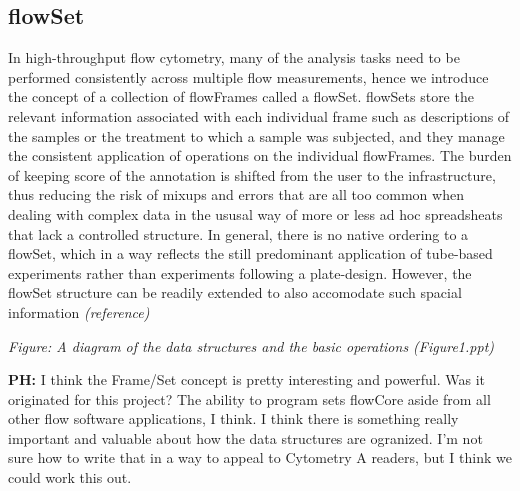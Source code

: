 \documentclass[12pt]{article}
\begin{document}
\subsection{flowSet}
In high-throughput flow cytometry, many of the analysis tasks need to
be performed consistently across multiple flow measurements, hence we
introduce the concept of a collection of flowFrames called a
flowSet. flowSets store the relevant information associated with each
individual frame such as descriptions of the samples or the treatment
to which a sample was subjected, and they manage the consistent
application of operations on the individual flowFrames. The burden of
keeping score of the annotation is shifted from the user to the
infrastructure, thus reducing the risk of mixups and errors that are
all too common when dealing with complex data in the ususal way of
more or less ad hoc spreadsheats that lack a controlled structure. In
general, there is no native ordering to a flowSet, which in a way
reflects the still predominant application of tube-based experiments
rather than experiments following a plate-design. However, the flowSet
structure can be readily extended to also accomodate such spacial
information \textit{(reference)}


\textit{Figure: A diagram of the data structures and the basic
  operations (Figure1.ppt)}

{\bf PH:} I think the Frame/Set concept is pretty interesting and
powerful. Was it originated for this project? The ability to program
sets flowCore aside from all other flow software applications, I
think. I think there is something really important and valuable about
how the data structures are ogranized. I'm not sure how to write that
in a way to appeal to Cytometry A readers, but I think we could work
this out.
\end{document}
